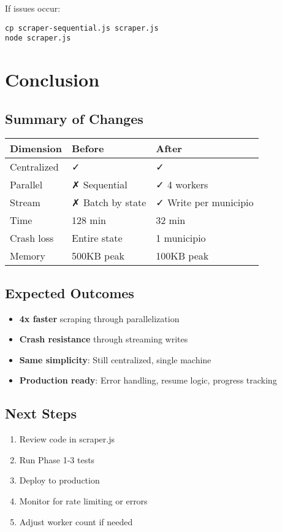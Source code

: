 \documentclass[11pt,a4paper]{article}
\begin{document}
If issues occur:
\begin{lstlisting}
cp scraper-sequential.js scraper.js
node scraper.js
\end{lstlisting}

\section{Conclusion}

\subsection{Summary of Changes}

\begin{tabular}{|l|l|l|}
\hline
\textbf{Dimension} & \textbf{Before} & \textbf{After} \\
\hline
Centralized & ✓ & ✓ \\
Parallel & ✗ Sequential & ✓ 4 workers \\
Stream & ✗ Batch by state & ✓ Write per municipio \\
\hline
Time & 128 min & 32 min \\
Crash loss & Entire state & 1 municipio \\
Memory & 500KB peak & 100KB peak \\
\hline
\end{tabular}

\subsection{Expected Outcomes}

\begin{itemize}
    \item \textbf{4x faster} scraping through parallelization
    \item \textbf{Crash resistance} through streaming writes
    \item \textbf{Same simplicity}: Still centralized, single machine
    \item \textbf{Production ready}: Error handling, resume logic, progress tracking
\end{itemize}

\subsection{Next Steps}

\begin{enumerate}
    \item Review code in scraper.js
    \item Run Phase 1-3 tests
    \item Deploy to production
    \item Monitor for rate limiting or errors
    \item Adjust worker count if needed
\end{enumerate}
\end{document}
